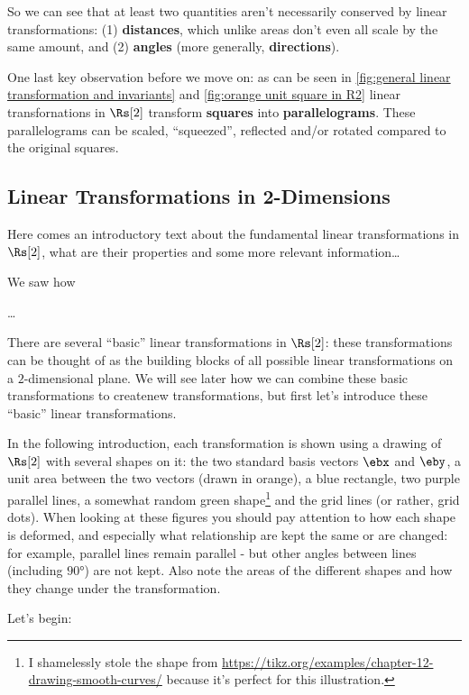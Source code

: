 So we can see that at least two quantities aren't necessarily conserved by linear transformations: (1) \textbf{distances}, which unlike areas don't even all scale by the same amount, and (2) \textbf{angles} (more generally, \textbf{directions}).

One last key observation before we move on: as can be seen in \autoref{fig:general linear transformation and invariants} and \autoref{fig:orange unit square in R2} linear transfornations in $\Rs[2]$ transform \textbf{squares} into \textbf{parallelograms}. These parallelograms can be scaled, \enquote{squeezed}, reflected and/or rotated compared to the original squares.

\subsection{Linear Transformations in 2-Dimensions}
Here comes an introductory text about the fundamental linear transformations in $\Rs[2]$, what are their properties and some more relevant information\dots

We saw how

\dots

There are several \enquote{basic} linear transformations in $\Rs[2]$: these transformations can be thought of as the building blocks of all possible linear transformations on a $2$-dimensional plane. We will see later how we can combine these basic transformations to createnew transformations, but first let's introduce these \enquote{basic} linear transformations.

In the following introduction, each transformation is shown using a drawing of $\Rs[2]$ with several shapes on it: the two standard basis vectors $\ebx$ and $\eby$, a unit area between the two vectors (drawn in orange), a blue rectangle, two purple parallel lines, a somewhat random green shape\footnote{I shamelessly stole the shape from \url{https://tikz.org/examples/chapter-12-drawing-smooth-curves/} because it's perfect for this illustration.} and the grid lines (or rather, grid dots). When looking at these figures you should pay attention to how each shape is deformed, and especially what relationship are kept the same or are changed: for example, parallel lines remain parallel - but other angles between lines (including $\ang{90}$) are not kept. Also note the areas of the different shapes and how they change under the transformation.

Let's begin:

